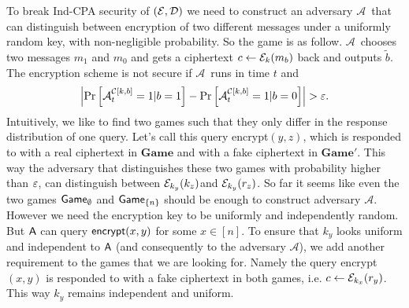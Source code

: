 \documentclass{article}
\def\A{{\sf A}}
\def\E{{\cal E}}
\def\D{{\cal D}}
\def\a {${\mathcal A}$}
\newcommand{\encrypt}{{\sf encrypt}}
\newcommand{\game}{{\sf Game}}
\newcommand{\dgame}{{\mathbf{Game}}}
\begin{document}
To break Ind-CPA security of $(\E,\D)$ we need to construct an adversary \a~that can distinguish between encryption of two different messages under a uniformly random key, with non-negligible probability. So the game is as follow. \a~chooses two messages $m_1$ and $m_0$ and gets a ciphertext $c\leftarrow \E_k(m_b)$ back and outputs $\tilde{b}$. The encryption scheme is not secure if \a~runs in time $t$ and
\[\abs{\prob{{\mathcal A}_{t}^{\mathcal{C}[k,b]}=1|b=1}-\prob{{\mathcal A}_{t}^{\mathcal{C}[k,b]}=1|b=0}}>\eps.\]
Intuitively, we like to find two games such that they only differ in the response distribution of one query. Let's  call this query \encrypt$(y,z)$, which is responded to with a real ciphertext in $\dgame$ and with a fake ciphertext in $\dgame'$. This way the adversary that distinguishes these two games with probability higher than $\varepsilon$, can distinguish between $\E_{k_y}(k_z)$and $\E_{k_y}(r_z)$. So far it seems like even the two games $\game_{\emptyset}$ and $\game_{\cub{n}}$ should be enough to construct adversary \a. However we need the encryption key to be uniformly and independently random. But $\A$ can query $\encrypt(x,y)$ for some $x \in [n]$. To ensure that $k_y$ looks uniform and independent to $\A$ (and consequently to the adversary \a), we add another requirement to the games that we are looking for. Namely the query \encrypt$(x,y)$ is responded to with a fake ciphertext in both games, i.e. $c \leftarrow \E_{k_x}(r_y)$. This way $k_y$ remains independent and uniform. \\
\end{document}
